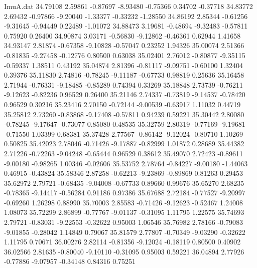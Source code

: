 \begin{filecontents}{ImuA.dat}
  34.79108    2.59861   -0.87697   -8.93480   -0.75366    0.34702   -0.37718
  34.83772    2.69432   -0.97866   -9.20040   -1.33377   -0.33232   -1.28550
  34.86192    2.85344   -0.61256   -9.31645   -0.94449    0.22489   -1.01072
  34.88473    3.19681   -0.48694   -9.32483   -0.57811    0.75920    0.26400
  34.90874    3.03171   -0.56830   -9.12862   -0.46361    0.62944    1.41658
  34.93147    2.81874   -0.67358   -9.10828   -0.57047    0.23252    1.94326
  35.00074    2.51366   -0.81835   -9.27458   -0.12776    0.80500    0.63038
  35.02401    2.76012   -0.80877   -9.35115   -0.59337    1.38511    0.43192
  35.04874    2.81396   -0.81117   -9.09751   -0.60100    1.32404    0.39376
  35.11830    2.74816   -0.78245   -9.11187   -0.67733    0.98819    0.25636
  35.16458    2.71944   -0.76331   -9.18485   -0.85289    0.74394    0.33269
  35.18848    2.73739   -0.76211   -9.12623   -0.82236    0.96529    0.26400
  35.21146    2.74337   -0.73819   -9.14537   -0.78420    0.96529    0.30216
  35.23416    2.70150   -0.72144   -9.00539   -0.63917    1.11032    0.44719
  35.25812    2.73260   -0.83868   -9.17408   -0.57811    0.94239    0.59221
  35.30442    2.80080   -0.78245   -9.17647   -0.73077    0.85080    0.48535
  35.32759    2.80319   -0.77169   -9.19681   -0.71550    1.03399    0.68381
  35.37428    2.77567   -0.86142   -9.12024   -0.80710    1.10269    0.50825
  35.42023    2.78046   -0.71426   -9.17887   -0.82999    1.01872    0.28689
  35.44382    2.71226   -0.72263   -9.04248   -0.65444    0.96529    0.38612
  35.49070    2.72423   -0.89611   -9.00180   -0.98265    1.00346   -0.02606
  35.53752    2.78764   -0.84227   -9.00180   -1.44063    0.46915   -0.43824
  35.58346    2.87258   -0.62213   -9.23869   -0.89869    0.81263    0.29453
  35.62972    2.79721   -0.68435   -9.04008   -0.67733    0.89660    0.99676
  35.65270    2.68235   -0.78365   -9.14417   -0.56284    0.91186    0.97386
  35.67688    2.72184   -0.77527   -9.20997   -0.69260    1.26298    0.88990
  35.70003    2.85583   -0.71426   -9.12623   -0.52467    1.24008    1.08073
  35.72299    2.86899   -0.77767   -9.01137   -0.31095    1.11795    1.22575
  35.74693    2.79721   -0.83031   -9.22553   -0.32622    0.95003    1.06546
  35.76982    2.78166   -0.79083   -9.01855   -0.28042    1.14849    0.79067
  35.81579    2.77807   -0.70349   -9.03290   -0.32622    1.11795    0.70671
  36.00276    2.82114   -0.81356   -9.12024   -0.18119    0.80500    0.40902
  36.02566    2.81635   -0.80040   -9.10110   -0.31095    0.95003    0.59221
  36.04894    2.77926   -0.77886   -9.07957   -0.34148    0.84316    0.75251

\end{filecontents}
